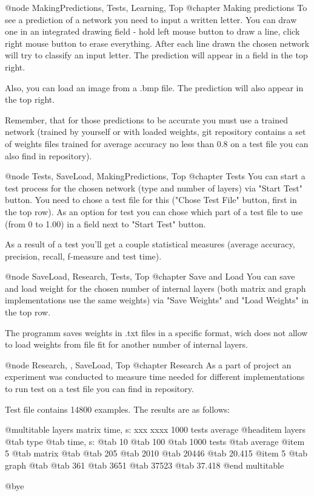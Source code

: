 @node MakingPredictions, Tests, Learning, Top
@chapter Making predictions
  To see a prediction of a network you need to input a written letter. You can draw one in an integrated drawing field - hold left mouse button to draw a line, click right mouse button to erase everything. After each line drawn the chosen network will try to classify an input letter. The prediction will appear in a field in the top right.

  Also, you can load an image from a .bmp file. The prediction will also appear in the top right.

  Remember, that for those predictions to be accurate you must use a trained network (trained by yourself or with loaded weights, git repository contains a set of weights files trained for average accuracy no less than 0.8 on a test file you can also find in repository).

@node Tests, SaveLoad, MakingPredictions, Top
@chapter Tests
  You can start a test process for the chosen network (type and number of layers) via "Start Test" button. You need to chose a test file for this ("Chose Test File" button, first in the top row). As an option for test you can chose which part of a test file to use (from 0 to 1.00) in a field next to "Start Test" button.

  As a result of a test you'll get a couple statistical measures (average accuracy, precision, recall, f-measure and test time).

@node SaveLoad, Research, Tests, Top
@chapter Save and Load
  You can save and load weight for the chosen number of internal layers (both matrix and graph implementations use the same weights) via "Save Weights" and "Load Weights" in the top row.

  The programm saves weights in .txt files in a specific format, wich does not allow to load weights from file fit for another number of internal layers.

@node Research, , SaveLoad, Top
@chapter Research
  As a part of project an experiment was conducted to measure time needed for different implementations to run test on a test file you can find in repository.

  Test file contains 14800 examples. The results are as follows:

@multitable {layers} {matrix} {time, s:} {xxx } {xxxx}  {1000 tests} {average}
@headitem layers @tab type @tab time, s: @tab 10 @tab 100 @tab 1000 tests @tab average
@item 5
@tab matrix
@tab 
@tab 205
@tab 2010
@tab 20446
@tab 20.415
@item 5
@tab graph
@tab 
@tab 361
@tab 3651
@tab 37523
@tab 37.418
@end multitable

@bye